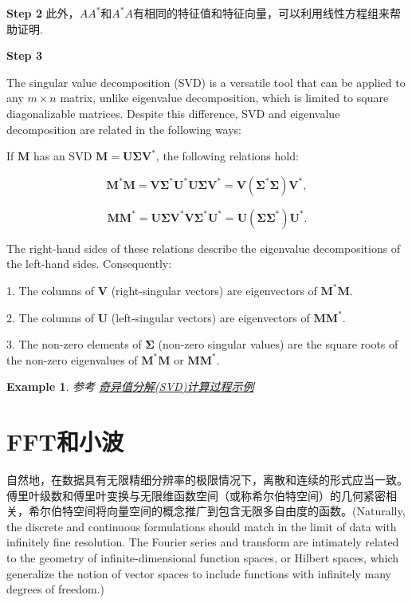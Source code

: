 \documentclass{ctexart}
\newtheorem{example}{Example}
\begin{document}
\textbf{Step 2}
此外，\( AA^*\)和\( A^*A\)有相同的特征值和特征向量，可以利用线性方程组来帮助证明.

\textbf{Step 3}

The singular value decomposition (SVD) is a versatile tool that can be applied to any \( m \times n \) matrix, unlike eigenvalue decomposition, which is limited to square diagonalizable matrices. Despite this difference, SVD and eigenvalue decomposition are related in the following ways:

If \( \mathbf{M} \) has an SVD \( \mathbf{M} = \mathbf{U} \mathbf{\Sigma} \mathbf{V}^* \), the following relations hold:

\[ 
\mathbf{M}^* \mathbf{M} = \mathbf{V} \mathbf{\Sigma}^* \mathbf{U}^* \mathbf{U} \mathbf{\Sigma} \mathbf{V}^* = \mathbf{V} (\mathbf{\Sigma}^* \mathbf{\Sigma}) \mathbf{V}^*, 
\]

\[ 
\mathbf{M} \mathbf{M}^* = \mathbf{U} \mathbf{\Sigma} \mathbf{V}^* \mathbf{V} \mathbf{\Sigma}^* \mathbf{U}^* = \mathbf{U} (\mathbf{\Sigma} \mathbf{\Sigma}^*) \mathbf{U}^*. 
\]

The right-hand sides of these relations describe the eigenvalue decompositions of the left-hand sides. Consequently:

1. The columns of \( \mathbf{V} \) (right-singular vectors) are eigenvectors of \( \mathbf{M}^* \mathbf{M} \).

2. The columns of \( \mathbf{U} \) (left-singular vectors) are eigenvectors of \( \mathbf{M} \mathbf{M}^* \).

3. The non-zero elements of \( \mathbf{\Sigma} \) (non-zero singular values) are the square roots of the non-zero eigenvalues of \( \mathbf{M}^* \mathbf{M} \) or \( \mathbf{M} \mathbf{M}^* \).

\begin{example}
    参考 \quad \href{https://www.cnblogs.com/marsggbo/p/10155801.html}{奇异值分解(SVD)计算过程示例}
\end{example}

\section{FFT和小波}

自然地，在数据具有无限精细分辨率的极限情况下，离散和连续的形式应当一致。傅里叶级数和傅里叶变换与无限维函数空间（或称希尔伯特空间）的几何紧密相关，希尔伯特空间将向量空间的概念推广到包含无限多自由度的函数。(Naturally, the discrete and continuous formulations should match in the limit of data with infinitely fine resolution. The Fourier series and transform are intimately related to the geometry of infinite-dimensional function spaces, or Hilbert spaces, which generalize the notion of vector spaces to include functions with infinitely many degrees of freedom.)
\end{document}
